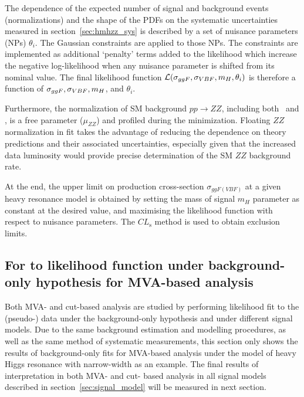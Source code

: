 The dependence of the expected number of signal and background events (normalizations) and the shape of the PDFs on the systematic uncertainties measured in section~\ref{sec:hmhzz_sys} 
is described by a set of nuisance parameters (NPs) $\theta_{i}$.
The Gaussian constraints are applied to those NPs.
The constraints are implemented as additional `penalty' terms added to the likelihood which increase the negative log-likelihood when any nuisance parameter is shifted from its nominal value. 
The final likelihood function ${\cal L } ( \sigma_{ggF}, \sigma_{VBF},m_{H},\theta_{i})$ is therefore a function of  $\sigma_{ggF}, \sigma_{VBF} , m_{H}$, and $\theta_{i}$.

Furthermore, the normalization of SM background $pp\to ZZ$, including both \qqZZ\ and \ggZZ, is a free parameter ($\mu_{ZZ}$) and profiled during the minimization.
Floating $ZZ$ normalization in fit takes the advantage of reducing the dependence on theory predictions and their associated uncertainties,
especially given that the increased data luminosity would provide precise determination of the SM $ZZ$ background rate.

At the end, the upper limit on production cross-section $\sigma_{ggF(VBF)}$ at a given heavy resonance model is obtained by setting the mass of signal $m_{H}$ parameter as constant at the desired value,
and maximising the likelihood function with respect to nuisance parameters.
The $CL_{\textrm{s}}$ \cite{cls} method is used to obtain exclusion limits.

\subsection{For to likelihood function under background-only hypothesis for MVA-based analysis}

Both MVA- and cut-based analysis are studied by performing likelihood fit to the (pseudo-) data under the background-only hypothesis and under different signal models.
Due to the same background estimation and modelling procedures, as well as the same method of systematic measurements,
this section only shows the results of background-only fits for MVA-based analysis under the model of heavy Higgs resonance with narrow-width as an example.
The final results of interpretation in both MVA- and cut- based analysis in all signal models described in section~\ref{sec:signal_model} will be measured in next section.

